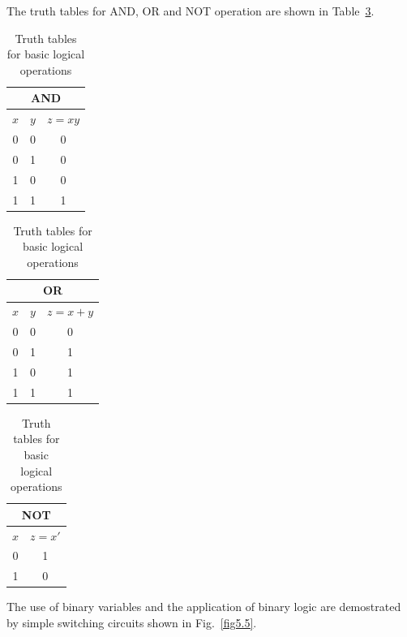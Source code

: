 The truth tables for AND, OR and NOT operation are shown in Table~\ref{tab5.4}.
\begin{table}[H]
\caption{Truth tables for basic logical operations}\label{tab5.4}
\begin{minipage}[c]{4.5cm}
\centering
\renewcommand{\arraystretch}{1.2}
\begin{tabular}{|cc|c|}
\hline
\multicolumn{3}{|c|}{\bf AND}\\
\hline
$x$ & $y$ & $z=xy$\\
\hline
0 & 0 & 0\\
0 & 1 & 0\\
1 & 0 & 0\\
1 & 1 & 1\\
\hline
\end{tabular}
\end{minipage}
\quad
\begin{minipage}[c]{4.5cm}
\centering
\renewcommand{\arraystretch}{1.2}
\begin{tabular}{|cc|c|}
\hline
\multicolumn{3}{|c|}{\bf OR}\\
\hline
$x$ & $y$ & $z=x+y$\\
\hline
0 & 0 & 0\\
0 & 1 & 1\\
1 & 0 & 1\\
1 & 1 & 1\\
\hline
\end{tabular}
\end{minipage}
\quad
\begin{minipage}[c]{4.5cm}
\centering
\renewcommand{\arraystretch}{1.1}
\begin{tabular}{|c|c|}
\hline
\multicolumn{2}{|c|}{\bf NOT}\\
\hline
$x$ & $z=x'$\\
\hline
0 & 1\\
1 & 0\\
\hline
\end{tabular}
\end{minipage}
\end{table}

The use of binary variables and the application of binary logic are demostrated by simple switching circuits shown in Fig.~\ref{fig5.5}.

